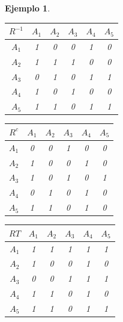 \documentclass[a5paper,doc,10pt,noapacite]{apa6}
\newtheorem{ejem}{Ejemplo}
\begin{document}
{{\begin{ejem}
\begin{table}[H]
   \fontsize{7}{11}\selectfont
    \begin{minipage}{.5\linewidth}
      \centering
	\begin{tabular}{c|ccccc} \thickline
	\(R^{-1}\) & \(A_1\) & \(A_2\) & \(A_3\) & \(A_4\) & \(A_5\)  \\
	\hline
    \(A_1\) & 1 & 0 & 0 & 1 & 0  \\
    \(A_2\) & 1 & 1 & 1 & 0 & 0  \\
	\(A_3\) & 0 & 1 & 0 & 1 & 1   \\
	\(A_4\) & 1 & 0 & 1 & 0 & 0   \\
	\(A_5\) & 1 & 1 & 0 & 1 & 1   \\
\end{tabular}
\label{tab:B4} 
    \end{minipage}%
    \begin{minipage}{.5\linewidth}
      \centering
	\begin{tabular}{c|ccccc} \thickline
	\(R^{c}\) & \(A_1\) & \(A_2\) & \(A_3\) & \(A_4\) & \(A_5\)  \\
	\hline
    \(A_1\) & 0 & 0 & 1 & 0 & 0  \\
    \(A_2\) & 1 & 0 & 0 & 1 & 0  \\
	\(A_3\) & 1 & 0 & 1 & 0 & 1   \\
	\(A_4\) & 0 & 1 & 0 & 1 & 0   \\
	\(A_5\) & 1 & 1 & 0 & 1 & 0   \\
\end{tabular}
\label{tab:B5} 
    \end{minipage} 
\end{table}


\begin{table}[H]
\fontsize{7}{11}\selectfont
\begin{center}
	\begin{tabular}{c|ccccc} \thickline
	\(RT\) & \(A_1\) & \(A_2\) & \(A_3\) & \(A_4\) & \(A_5\)  \\
	\hline
    \(A_1\) & 1 & 1 & 1 & 1 & 1  \\
    \(A_2\) & 1 & 0 & 0 & 1 & 0  \\
	\(A_3\) & 0 & 0 & 1 & 1 & 1   \\
	\(A_4\) & 1 & 1 & 0 & 1 & 0   \\
	\(A_5\) & 1 & 1 & 0 & 1 & 1   \\
\end{tabular}
\label{tab:B6} 
\end{center}
\end{table}
\end{ejem}

}}
\end{document}
